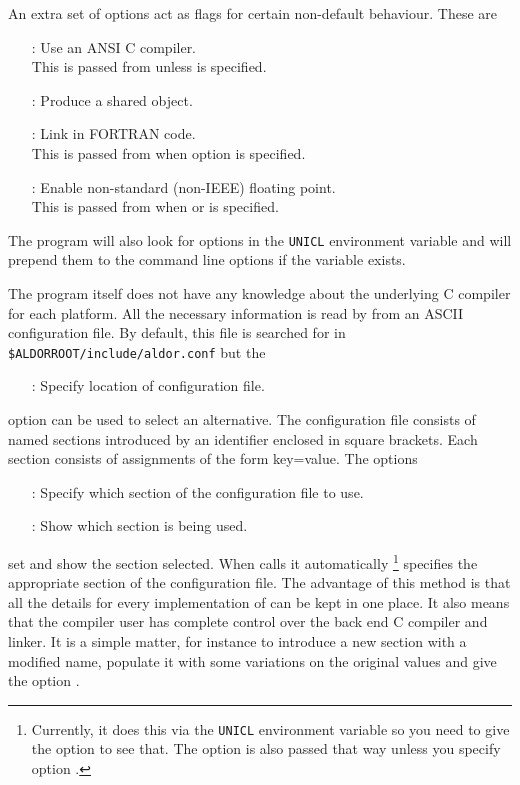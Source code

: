 An extra set of options act as flags for certain non-default \uniclcmd{} behaviour. These are
\begin{itemize}
\item [\uoption{-Wstdc} :] Use an ANSI C compiler. \\ This is passed  from \asharpcmd{}
unless \asharpcmd{}  is specified.
\item [\uoption{-Wshared} :] Produce a shared object.
\item [\uoption{-Wfortran} :] Link in FORTRAN code. \\ This is passed from \asharpcmd{}
when \asharpcmd{} option  is specified.
\item [\uoption{-Wfnonstd} :] Enable non-standard (non-IEEE) floating point. \\ This is passed
from \asharpcmd{} when \asharpcmd{}  or  is specified.
\end{itemize}

The \uniclcmd{} program will also look for options in the {\tt UNICL} environment variable
and will prepend them to the command line options if the variable exists.

The \uniclcmd{} program itself does not have any knowledge about the underlying
C compiler for each platform. All the necessary information is read by \uniclcmd{} from 
an ASCII configuration file. By default, this file is searched for in 
{\tt \$ALDORROOT/include/aldor.conf} but the 
\begin{itemize}
\item [\uoption{-Wconfig=\meta{file}} :] Specify location of configuration file.
\end{itemize}

option can be used to select an alternative. The configuration file consists of named sections
introduced by an identifier enclosed in square brackets. Each section consists of assignments of the 
form key=value. The options
\begin{itemize}
\item [\uoption{-Wsys=\meta{name}} :] Specify which section of the configuration file to use.
\item [\uoption{-Wv=2} :] Show which section is being used.
\end{itemize}

set and show the section selected. When \asharpcmd{} calls \uniclcmd{} it automatically
\footnote {Currently, it does this
via the {\tt UNICL} environment variable so you need to give the \asharpcmd{} option
 to see that. The \uniclcmd{} option  is also passed that way
unless you specify \asharpcmd{} option .} 
specifies the appropriate section of the configuration file. 
The advantage of this method is that 
all the details for every implementation of \asharpName{} can be kept in one place.
It also means that the compiler user has complete control over the back end C compiler
and linker. It is a simple matter, for instance to introduce a new section with a modified name, 
populate it with some  variations on the original values and give the \asharpcmd{} option 
.

